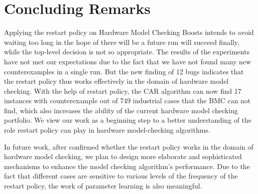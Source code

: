 \section{Concluding Remarks}
Applying the restart policy on Hardware Model Checking Boosts intends to avoid waiting too long in the hope of there will be a future run will succeed finally, while the top-level decision is not so appropriate. The results of the experiments have not met our expectations due to the fact that we have not found many new counterexamples in a single run. But the new finding of 12 bugs indicates that the restart policy thus works effectively in the domain of hardware model checking. With the help of restart policy, the CAR algorithm can now find 17 instances with counterexample out of 749 industrial cases that the BMC can not find, which also increases the ability of the current hardware model checking portfolio. We view our work as a beginning step to a better understanding of the role restart policy can play in hardware model-checking algorithms.

In future work, after confirmed whether the restart policy works in the domain of hardware model checking, we plan to design more elaborate and sophisticated mechanisms to enhance the model checking algorithm's performance. Due to the fact that different cases are sensitive to various levels of the frequency of the restart policy, the work of parameter learning is also meaningful.


